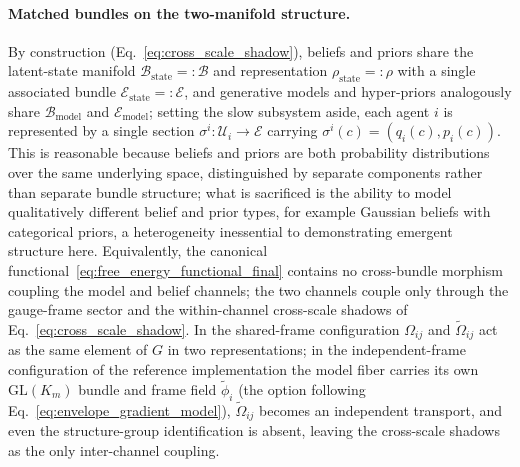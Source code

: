 \documentclass[11pt]{article}
\begin{document}
\paragraph{Matched bundles on the two-manifold structure.}
By construction (Eq.~\eqref{eq:cross_scale_shadow}), beliefs and priors share the latent-state manifold $\mathcal{B}_{\mathrm{state}} =: \mathcal{B}$ and representation $\rho_{\mathrm{state}} =: \rho$ with a single associated bundle $\mathcal{E}_{\mathrm{state}} =: \mathcal{E}$, and generative models and hyper-priors analogously share $\mathcal{B}_{\mathrm{model}}$ and $\mathcal{E}_{\mathrm{model}}$; setting the slow subsystem aside, each agent $i$ is represented by a single section $\sigma^i: \mathcal{U}_i \to \mathcal{E}$ carrying $\sigma^i(c) = (q_i(c), p_i(c))$. This is reasonable because beliefs and priors are both probability distributions over the same underlying space, distinguished by separate components rather than separate bundle structure; what is sacrificed is the ability to model qualitatively different belief and prior types, for example Gaussian beliefs with categorical priors, a heterogeneity inessential to demonstrating emergent structure here. Equivalently, the canonical functional~\eqref{eq:free_energy_functional_final} contains no cross-bundle morphism coupling the model and belief channels; the two channels couple only through the gauge-frame sector and the within-channel cross-scale shadows of Eq.~\eqref{eq:cross_scale_shadow}. In the shared-frame configuration $\Omega_{ij}$ and $\tilde{\Omega}_{ij}$ act as the same element of $G$ in two representations; in the independent-frame configuration of the reference implementation the model fiber carries its own $\mathrm{GL}(K_m)$ bundle and frame field $\tilde{\phi}_i$ (the option following Eq.~\eqref{eq:envelope_gradient_model}), $\tilde{\Omega}_{ij}$ becomes an independent transport, and even the structure-group identification is absent, leaving the cross-scale shadows as the only inter-channel coupling.
\end{document}
